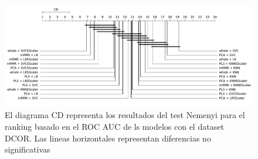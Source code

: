 \documentclass[a4paper,oneside,11pt,leqno]{article}
\begin{document}
	
	\begin{figure}[h]
		\includegraphics[width=\linewidth]{stat_results_fft.pdf}
		\caption{El diagrama CD representa los resultados del test Nemenyi para el ranking basado en el ROC AUC de ls modelos con el dataset DCOR. Las lineas horizontales representan diferencias no significativas}
		\label{fig:stats_fig_fft}
	\end{figure}
\end{document}
